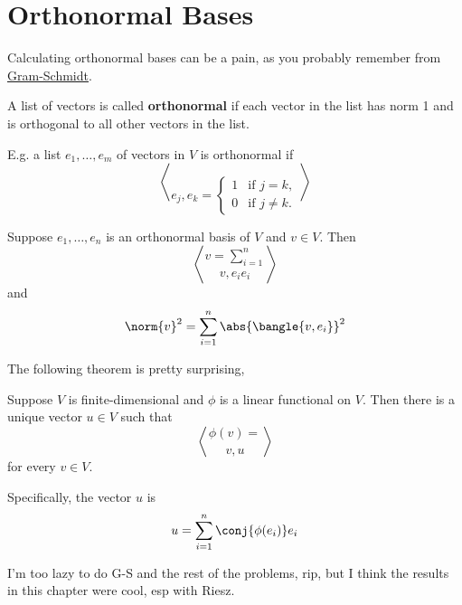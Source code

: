 \section{Orthonormal Bases}

Calculating orthonormal bases can be a pain, as you probably remember from \href{https://en.wikipedia.org/wiki/Gram%E2%80%93Schmidt_process}{Gram-Schmidt}.

\begin{definition}
  A list of vectors is called \textbf{orthonormal} if each vector in the list has norm 1 and is orthogonal to all other vectors in the list.

  E.g. a list $e_1, \dots, e_m$ of vectors in $V$ is orthonormal if
  \begin{equation}
    \bangle{
      e_j, e_k
    } = \begin{cases}
      1 & \text{if } j = k,    \\
      0 & \text{if } j \neq k.
    \end{cases}
  \end{equation}
\end{definition}

\begin{theorem}
  Suppose $e_1, \dots, e_n$ is an orthonormal basis of $V$ and $v \in V$. Then
  \begin{equation}
    v = \sum_{i=1}^n \bangle{v, e_i}e_i
  \end{equation}
  and
  \begin{equation}
    \norm{v}^2 = \sum_{i=1}^n \abs{
      \bangle{v, e_i}
    }^2
  \end{equation}
\end{theorem}

The following theorem is pretty surprising,
\begin{theorem}
  Suppose $V$ is finite-dimensional and $\phi$ is a linear functional on $V$.
  Then there is a unique vector $u \in  V$ such that
  \begin{equation}
    \phi(v) = \bangle{v, u}
  \end{equation}
  for every $v \in V$.

  Specifically, the vector $u$ is
  \begin{equation}
    u = \sum_{i=1}^n \conj{\phi(e_i)}e_i
  \end{equation}
\end{theorem}



I'm too lazy to do G-S and the rest of the problems, rip, but I think the results in this chapter were cool, esp with Riesz.